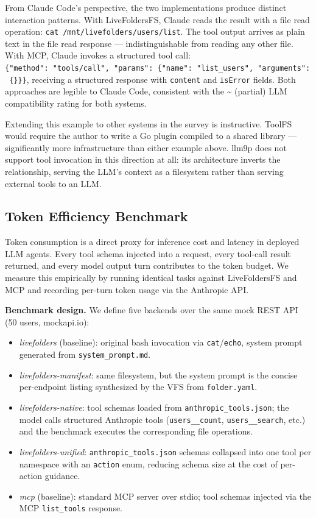 \documentclass[
  11pt,
]{article}
\providecommand{\tightlist}{%
  \setlength{\itemsep}{0pt}\setlength{\parskip}{0pt}}
\begin{document}
From Claude Code's perspective, the two implementations produce distinct
interaction patterns. With LiveFoldersFS, Claude reads the result with a
file read operation: \texttt{cat\ /mnt/livefolders/users/list}. The tool
output arrives as plain text in the file read response ---
indistinguishable from reading any other file. With MCP, Claude invokes
a structured tool call:
\texttt{\{"method":\ "tools/call",\ "params":\ \{"name":\ "list\_users",\ "arguments":\ \{\}\}\}},
receiving a structured response with \texttt{content} and
\texttt{isError} fields. Both approaches are legible to Claude Code,
consistent with the \textasciitilde{} (partial) LLM compatibility rating
for both systems.

Extending this example to other systems in the survey is instructive.
ToolFS would require the author to write a Go plugin compiled to a
shared library --- significantly more infrastructure than either example
above. llm9p does not support tool invocation in this direction at all:
its architecture inverts the relationship, serving the LLM's context as
a filesystem rather than serving external tools to an LLM.

\hypertarget{token-efficiency-benchmark}{%
\subsection{Token Efficiency
Benchmark}\label{token-efficiency-benchmark}}

Token consumption is a direct proxy for inference cost and latency in
deployed LLM agents. Every tool schema injected into a request, every
tool-call result returned, and every model output turn contributes to
the token budget. We measure this empirically by running identical tasks
against LiveFoldersFS and MCP and recording per-turn token usage via the
Anthropic API.

\textbf{Benchmark design.} We define five backends over the same mock
REST API (50 users, mockapi.io):

\begin{itemize}
\tightlist
\item
  \emph{livefolders} (baseline): original bash invocation via
  \texttt{cat}/\texttt{echo}, system prompt generated from
  \texttt{system\_prompt.md}.
\item
  \emph{livefolders-manifest}: same filesystem, but the system prompt is
  the concise per-endpoint listing synthesized by the VFS from
  \texttt{folder.yaml}.
\item
  \emph{livefolders-native}: tool schemas loaded from
  \texttt{anthropic\_tools.json}; the model calls structured Anthropic
  tools (\texttt{users\_\_count}, \texttt{users\_\_search}, etc.) and
  the benchmark executes the corresponding file operations.
\item
  \emph{livefolders-unified}: \texttt{anthropic\_tools.json} schemas
  collapsed into one tool per namespace with an \texttt{action} enum,
  reducing schema size at the cost of per-action guidance.
\item
  \emph{mcp} (baseline): standard MCP server over stdio; tool schemas
  injected via the MCP \texttt{list\_tools} response.
\end{itemize}
\end{document}
